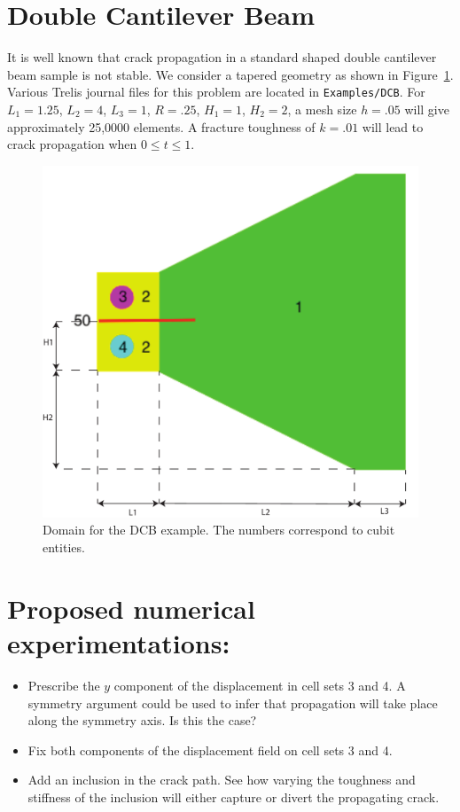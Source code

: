 \documentclass[10pt,oneside]{memoir}
\begin{document}
\section{Double Cantilever Beam}
It is well known that crack propagation in a standard shaped double cantilever beam sample is not stable. We consider a tapered geometry as shown in Figure~\ref{fig:DCB}. Various Trelis journal files for this problem are located in \verb+Examples/DCB+. For $L_1=1.25$, $L_2 = 4$, $L_3=1$, $R = .25$, $H_1=1$, $H_2 = 2$, a mesh size $h=.05$ will give approximately 25,0000 elements. A fracture toughness of $k=.01$ will lead to crack propagation when $0 \le t \le 1$.

\begin{figure}[H]
\centering
	\includegraphics[width = .5\textwidth]{Examples/DCB/Geometry.pdf}
\caption{Domain for the DCB example. The numbers correspond to cubit entities.}
\label{fig:DCB}
\end{figure}

\section*{Proposed numerical experimentations:}
\begin{itemize}
	\item Prescribe the $y$ component of the displacement in cell sets 3 and 4. A symmetry argument could be used to infer that propagation will take place along the symmetry axis. Is this the case? 
	\item Fix both components of the displacement field on cell sets 3 and 4. 
	\item Add an inclusion in the crack path. See how varying the toughness and stiffness of the inclusion will either capture or divert the propagating crack.
\end{itemize}
\end{document}
